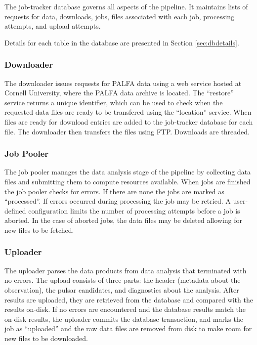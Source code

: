 \documentclass[12pt]{article}
\begin{document}
The job-tracker database governs all aspects of the pipeline. It maintains lists of requests for data, downloads, jobs, files associated with each job, processing attempts, and upload attempts.

Details for each table in the database are presented in Section \ref{sec:dbdetails}.

\subsubsection{Downloader}
The downloader issues requests for PALFA data using a web service hosted at Cornell University, where the PALFA data archive is located. The ``restore'' service returns a unique identifier, which can be used to check when the requested data files are ready to be transfered using the ``location'' service. When files are ready for download entries are added to the job-tracker database for each file. The downloader then transfers the files using FTP. Downloads are threaded.

\subsubsection{Job Pooler}
The job pooler manages the data analysis stage of the pipeline by collecting data files and submitting them to compute resources available. When jobs are finished the job pooler checks for errors. If there are none the jobs are marked as ``processed''. If errors occurred during processing the job may be retried. A user-defined configuration limits the number of processing attempts before a job is aborted. In the case of aborted jobs, the data files may be deleted allowing for new files to be fetched.

\subsubsection{Uploader}
The uploader parses the data products from data analysis that terminated with no errors. The upload consists of three parts: the header (metadata about the observation), the pulsar candidates, and diagnostics about the analysis. After results are uploaded, they are retrieved from the database and compared with the results on-disk. If no errors are encountered and the database results match the on-disk results, the uploader commits the database transaction, and marks the job as ``uploaded'' and the raw data files are removed from disk to make room for new files to be downloaded.
\end{document}
